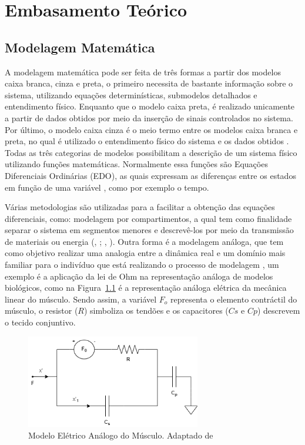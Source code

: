 \chapter[Embasamento Teórico]{Embasamento Teórico}
\section{Modelagem Matemática} 

A modelagem matemática pode ser feita de três formas a partir dos modelos caixa branca, cinza e preta, o primeiro necessita de bastante informação sobre o sistema, utilizando equações determinísticas, submodelos detalhados e entendimento físico. Enquanto que o modelo caixa preta, é realizado unicamente a partir de dados obtidos por meio da inserção de sinais controlados no sistema. Por último, o modelo caixa cinza é o meio termo entre os modelos caixa branca e preta, no qual é utilizado o entendimento físico do sistema e os dados obtidos \cite{barbosa2010}. Todas as três categorias de modelos possibilitam a descrição de um sistema físico utilizando funções matemáticas. Normalmente essa funções são Equações Diferenciais Ordinárias (EDO), as quais expressam as diferenças entre os estados em função de uma variável \cite{witelski2015}, como por exemplo o tempo. 

Várias metodologias são utilizadas para a facilitar a obtenção das equações diferenciais, como: modelagem por compartimentos, a qual tem como finalidade separar o sistema em segmentos menores e descrevê-los por meio da transmissão de materiais ou energia (\citeauthor{anderson2013compartmental}, \citeyear{anderson2013compartmental}; \citeauthor{King2011}, \citeyear{King2011}). Outra forma é a modelagem análoga, que tem como objetivo realizar uma analogia entre a dinâmica real e um domínio mais familiar para o indivíduo que está realizando o processo de modelagem \cite{Khoo2000}, um exemplo é a aplicação da lei de Ohm na representação análoga de modelos biológicos, como na Figura~\ref{exemplo_analogo1} é a  representação análoga elétrica da mecânica linear do músculo. Sendo assim, a variável $F_o$ representa o elemento contráctil do músculo, o resistor ($R$) simboliza os tendões e os capacitores ($Cs$ e $Cp$) descrevem o tecido conjuntivo.

\begin{figure}[htb]
 \begin{center}
  \includegraphics[width=3.0in]{figuras/linear_musculo.png}
   \caption{{Modelo Elétrico Análogo do Músculo. Adaptado de \cite{Khoo2000}}}
   \label{exemplo_analogo1} 
  \end{center}
\end{figure}

